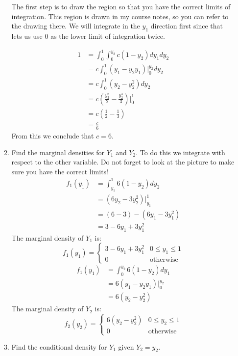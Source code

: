 \documentclass[12pt]{article}
\begin{document}
\begin{enumerate}
\begin{enumerate}
The first step is to draw the region so that you have the correct limits of integration. This region is drawn in my course notes, so you can refer to the drawing there. We will integrate in the $y_1$ direction first since that lets us use 0 as the lower limit of integration twice.

\begin{align*}
1 &= \int_0^1 \int_0^{y_2} c(1 - y_2) dy_1 dy_2 \\
&= c \int_0^1 (y_1 - y_2 y_1)\Bigr|_0^{y_2} dy_2 \\
&= c \int_0^1 (y_2 - y_2^2) dy_2 \\
&= c \left( \frac{y_2^2}{2} - \frac{y_2^3}{3} \right)\Bigr|_0^1 \\
&= c \left( \frac{1}{2} - \frac{1}{3} \right)\\
&= \frac{c}{6}
\end{align*}
From this we conclude that $c = 6$.

\item Find the marginal densities for $Y_1$ and $Y_2$.
To do this we integrate with respect to the other variable. Do not forget to look at the picture to make sure you have the correct limits!
\begin{align*}
f_1(y_1) &= \int_{y_1}^1 6(1 - y_2) dy_2 \\
&= (6 y_2 - 3 y_2^2) \Bigr|_{y_1}^1 \\
&= (6 - 3) - (6 y_1 - 3 y_1^2) \\
&= 3 - 6y_1 + 3 y_1^2
\end{align*}
The marginal density of $Y_1$ is:
\[
f_1(y_1) = \begin{cases}
3 - 6y_1 + 3 y_1^2 & 0 \leq y_1 \leq 1 \\
0 & \text{otherwise}
\end{cases}
\]
\begin{align*}
f_1(y_1) &= \int_{0}^{y_2} 6(1 - y_2) dy_1 \\
&= 6( y_1 - y_2 y_1) \Bigr|_0^{y_2} \\
&= 6( y_2 - y_2^2)
\end{align*}
The marginal density of $Y_2$ is:
\[
f_2(y_2) = \begin{cases}
6( y_2 - y_2^2) & 0 \leq y_2 \leq 1 \\
0 & \text{otherwise}
\end{cases}
\]

\item Find the conditional density for $Y_1$ given $Y_2 = y_2$.\\


\end{enumerate}
\end{enumerate}
\end{document}
